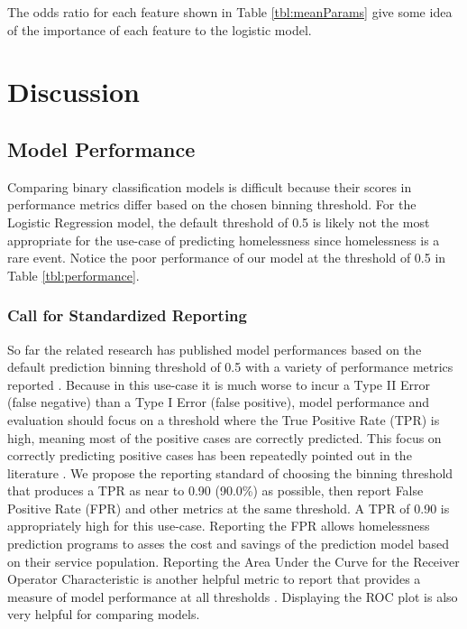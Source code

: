 \documentclass[10pt,letterpaper]{article}
\newcommand{\red}[1]{{\color{red}{#1}}}
\begin{document}
The odds ratio for each feature shown in Table \ref{tbl:meanParams} give some idea of the importance of each feature to the logistic model. 

\section*{Discussion}
\subsection*{Model Performance}
Comparing binary classification models is difficult because their scores in performance metrics differ based on the chosen binning threshold. For the Logistic Regression model, the default threshold of 0.5 is likely not the most appropriate for the use-case of predicting homelessness since homelessness is a rare event. Notice the poor performance of our model at the threshold of 0.5 in Table \ref{tbl:performance}. 

\subsubsection*{Call for Standardized Reporting}
So far the related research has published model performances based on the default prediction binning threshold of 0.5 with a variety of performance metrics reported \red{Add citation}. Because in this use-case it is much worse to incur a Type II Error (false negative) than a Type I Error (false positive), model performance and evaluation should focus on a threshold where the True Positive Rate (TPR) is high, meaning most of the positive cases are correctly predicted. This focus on correctly predicting positive cases has been repeatedly pointed out in the literature \cite{vanberlo2021interpretable} \red{ADD SOURCES HERE}. We propose the reporting standard of choosing the binning threshold that produces a TPR as near to 0.90 (90.0\%) as possible, then report False Positive Rate (FPR) and other metrics at the same threshold. A TPR of 0.90 is appropriately high for this use-case. Reporting the FPR allows homelessness prediction programs to asses the cost and savings of the prediction model based on their service population. Reporting the Area Under the Curve for the Receiver Operator Characteristic is another helpful metric to report that provides a measure of model performance at all thresholds \red{Do we care about performance at other thresholds?}. Displaying the ROC plot is also very helpful for comparing models. 
\end{document}
